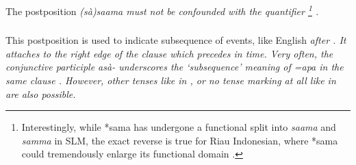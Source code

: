  


% 
% 
%  
%   


The postposition \em (sà)saama \em must not be confounded with the quantifier \footnote{Interestingly, while *sama has undergone a functional split into \textit{saama} and \textit{samma} in SLM, the exact reverse is true for Riau Indonesian, where *sama could tremendously enlarge its functional domain \citep{Gil2004sama}.} .


\subsubsection{}\label{sec:morph:=apa}
This postposition is used to indicate subsequence of events, like English \em after \em {}.  It attaches to the right edge of the clause which precedes in time. Very often, the conjunctive participle \em asà- \em  underscores the `subsequence' meaning of \em =apa \em in the same clause  . However, other tenses like in , or no tense marking at all like in  are also possible.

